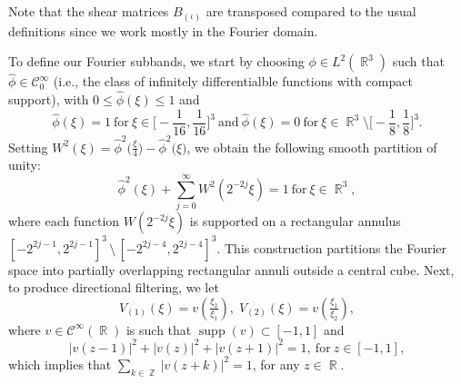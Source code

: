 \documentclass[11pt,a4paper]{article}
\numberwithin{equation}{section}
\DeclareMathOperator{\R}{\mathbb{R}}
\DeclareMathOperator{\Z}{\mathbb{Z}}
\newcommand{\abs}[1]{\left|#1\right|}
\DeclareMathOperator{\supp}{supp}
\newcommand{\bump}{\widehat{\phi}} %
\begin{document}
Note that the shear matrices $B_{(\iota)}$ are transposed compared to the usual definitions since we work mostly in the Fourier domain.

To define our Fourier subbands, we start by  choosing $\phi \in L^2(\R^3)$ such that $\bump \in \mathcal{C}_0^\infty$ (i.e., the class of infinitely differentialble functions with compact support), with $0 \leq \bump(\xi) \leq 1$ and
\begin{equation}  \label{eq.phi}
    \bump(\xi) = 1 \ \text{for} \ \xi \in \Big[ -\frac{1}{16}, \frac{1}{16} \Big]^3 \ \text{and} \ \bump(\xi) = 0 \ \text{for} \ \xi \in \R^3 \setminus \Big[ -\frac{1}{8}, \frac{1}{8} \Big]^3.
\end{equation}
Setting
    $W^2(\xi) = \bump^2\Big( \tfrac{\xi}{4} \Big) - \bump^2\big( \xi \big)$,
we obtain the following smooth partition of unity:
\begin{equation} \label{eq:discrete Calderon}
    \bump^2(\xi) + \sum_{j = 0}^\infty W^2\left( 2^{-2j} \xi \right) = 1 \ \text{for} \ \xi \in \R^3,
\end{equation}
where each function $W\left( 2^{-2j} \xi \right)$ is supported on a rectangular annulus $\left[ -2^{2j - 1}, 2^{2j - 1} \right]^3 \, \setminus \, \left[ -2^{2j - 4}, 2^{2j - 4} \right]^3$. This construction partitions the Fourier space into partially overlapping rectangular annuli outside a central cube.
Next, to produce directional filtering, we let
\begin{equation*}
    V_{(1)} (\xi) = v\left( \tfrac{\xi_2}{\xi_1} \right), \; V_{(2)} (\xi) = v\left( \tfrac{\xi_1}{\xi_2} \right),
\end{equation*}
where $v \in \mathcal{C}^\infty(\R)$ is such that $\supp(v) \subset [-1, 1]$ and 
\begin{equation} \label{eq.v}
    \abs{v(z-1)}^2 + \abs{v(z)}^2 + \abs{v(z+1)}^2 = 1, \ \text{for} \ z \in [-1, 1],
\end{equation}
which implies that $\sum_{k \in \Z}\limits \abs{v(z+k)}^2 = 1$, for any $z \in \R$.
\end{document}
